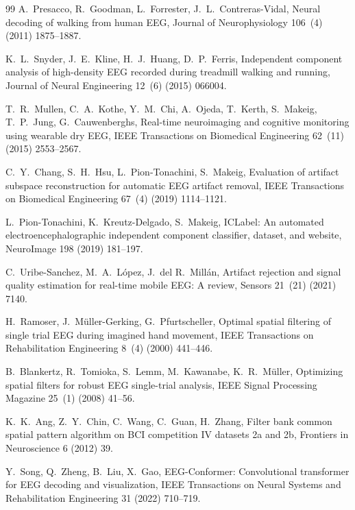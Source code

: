 \documentclass[review,12pt]{elsarticle}
\begin{document}
\begin{thebibliography}{99}
A.~Presacco, R.~Goodman, L.~Forrester, J.~L.~Contreras-Vidal, Neural decoding of walking from human EEG, Journal of Neurophysiology 106~(4) (2011) 1875--1887.

K.~L.~Snyder, J.~E.~Kline, H.~J.~Huang, D.~P.~Ferris, Independent component analysis of high-density EEG recorded during treadmill walking and running, Journal of Neural Engineering 12~(6) (2015) 066004.

T.~R.~Mullen, C.~A.~Kothe, Y.~M.~Chi, A.~Ojeda, T.~Kerth, S.~Makeig, T.~P.~Jung, G.~Cauwenberghs, Real-time neuroimaging and cognitive monitoring using wearable dry EEG, IEEE Transactions on Biomedical Engineering 62~(11) (2015) 2553--2567.

C.~Y.~Chang, S.~H.~Hsu, L.~Pion-Tonachini, S.~Makeig, Evaluation of artifact subspace reconstruction for automatic EEG artifact removal, IEEE Transactions on Biomedical Engineering 67~(4) (2019) 1114--1121.

L.~Pion-Tonachini, K.~Kreutz-Delgado, S.~Makeig, ICLabel: An automated electroencephalographic independent component classifier, dataset, and website, NeuroImage 198 (2019) 181--197.

C.~Uribe-Sanchez, M.~A.~López, J.~del R.~Millán, Artifact rejection and signal quality estimation for real-time mobile EEG: A review, Sensors 21~(21) (2021) 7140.

H.~Ramoser, J.~Müller-Gerking, G.~Pfurtscheller, Optimal spatial filtering of single trial EEG during imagined hand movement, IEEE Transactions on Rehabilitation Engineering 8~(4) (2000) 441--446.

B.~Blankertz, R.~Tomioka, S.~Lemm, M.~Kawanabe, K.~R.~Müller, Optimizing spatial filters for robust EEG single-trial analysis, IEEE Signal Processing Magazine 25~(1) (2008) 41--56.

K.~K.~Ang, Z.~Y.~Chin, C.~Wang, C.~Guan, H.~Zhang, Filter bank common spatial pattern algorithm on BCI competition IV datasets 2a and 2b, Frontiers in Neuroscience 6 (2012) 39.

Y.~Song, Q.~Zheng, B.~Liu, X.~Gao, EEG-Conformer: Convolutional transformer for EEG decoding and visualization, IEEE Transactions on Neural Systems and Rehabilitation Engineering 31 (2022) 710--719.


\end{thebibliography}
\end{document}
